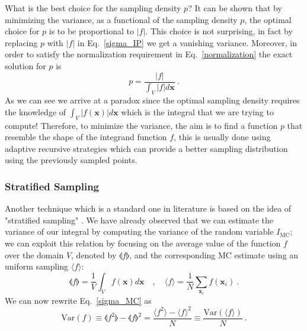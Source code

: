 \documentclass[../main/main.tex]{subfiles}
\begin{document}
What is the best choice for the sampling density $p$?
It can be shown that by minimizing the variance, as a functional of the sampling density $p$, the optimal choice for $p$ is to be proportional 
to $|f|$. This choice is not surprising, in fact by replacing $p$ with $|f|$ in Eq.~\ref{sigma_IP} we get a vanishing variance.
Moreover, in order to satisfy the normalization requirement in Eq.~\ref{normalization} the exact solution for $p$ is
\begin{equation}
	p = \frac{|f|}{\int_V |f| d\textbf{x}} \ .
\end{equation}
\newline
As we can see we arrive at a paradox since the optimal sampling density requires the knowledge of $\int_V |f(\textbf{x})| d\textbf{x}$ which is the integral that we are trying to compute!
\newline
Therefore, to minimize the variance, the aim is to find a function $p$ that resemble the shape of the integrand function $f$, this is usually done 
using adaptive recursive strategies which can provide a better sampling distribution using the previously sampled points.
\subsubsection{Stratified Sampling}
Another technique which is a standard one in literature is based on the idea of  "stratified sampling" \cite{ Press:1992zz, Press:1989vk,}.
We have already observed that we can estimate the variance of our integral by computing the variance of the random variable $I_{\text{MC}}$; we can exploit this relation by focusing on the average value of the function $f$ over the domain $V$, denoted by $\llangle  f \rrangle $, and the corresponding MC estimate using an uniform sampling $ \langle f \rangle$:
\begin{equation}
	\llangle  f \rrangle = \frac{1}{V} \int_V f(\textbf{x}) d\textbf{x} \quad ,  \quad 
	\langle f \rangle = \frac{1}{N} \sum_{\textbf{x}_i} f(\textbf{x}_i) \ .
\end{equation}
We can now rewrite Eq.~\ref{sigma_MC} as  
\begin{equation}
	\text{Var}( f ) \equiv \llangle f^2 \rrangle - \llangle f \rrangle ^2 = \frac{\langle f^2 \rangle - \langle f \rangle^2}{N} \equiv \frac{\text{Var}(\langle f \rangle )}{N} \ .
\end{equation}
\end{document}
